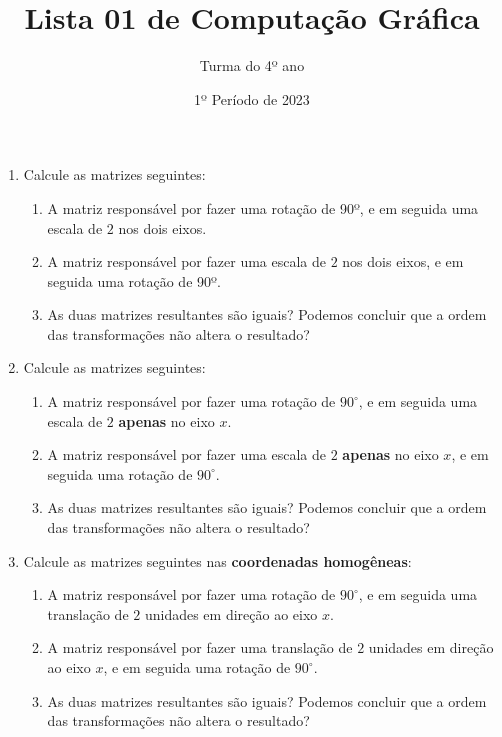\documentclass[12pt]{article}
\title{Lista 01 de Computação Gráfica}
\date{1º Período de 2023}
\author{Turma do 4º ano}
\begin{document}
\maketitle

\begin{enumerate}


\item Calcule as matrizes seguintes:

\begin{enumerate}

\item A matriz responsável por fazer uma rotação de 90º, e em seguida uma escala de $2$ nos dois eixos.

\item A matriz responsável por fazer uma escala de $2$ nos dois eixos, e em seguida uma rotação de 90º.

\item As duas matrizes resultantes são iguais? Podemos concluir que a ordem das transformações não altera o resultado?

\end{enumerate}

\item Calcule as matrizes seguintes:

\begin{enumerate}

\item A matriz responsável por fazer uma rotação de $90^\circ$, e em seguida uma escala de $2$ \textbf{apenas} no eixo $x$.

\item A matriz responsável por fazer uma escala de $2$ \textbf{apenas} no eixo $x$, e em seguida uma rotação de $90^\circ$.

\item As duas matrizes resultantes são iguais? Podemos concluir que a ordem das transformações não altera o resultado?

\end{enumerate}

\item Calcule as matrizes seguintes nas \textbf{coordenadas homogêneas}:

\begin{enumerate}

\item A matriz responsável por fazer uma rotação de $90^\circ$, e em seguida uma translação de $2$ unidades em direção ao eixo $x$.

\item A matriz responsável por fazer uma translação de $2$ unidades em direção ao eixo $x$, e em seguida uma rotação de $90^\circ$.

\item As duas matrizes resultantes são iguais? Podemos concluir que a ordem das transformações não altera o resultado?

\end{enumerate}


\end{enumerate}
\end{document}
